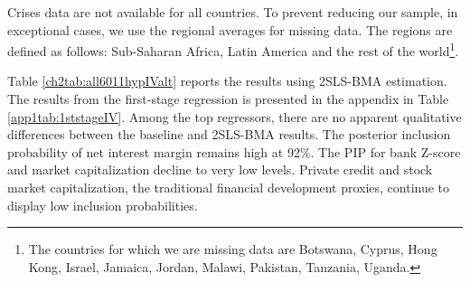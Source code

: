 \begin{refsection}
Crises data are not available for all countries. To prevent reducing our sample, in exceptional cases, we use the regional averages for missing data. The regions are defined as follows: Sub-Saharan Africa, Latin America and the rest of the world\footnote{The countries for which we are missing data are Botswana, Cyprus, Hong Kong, Israel, Jamaica, Jordan, Malawi, Pakistan, Tanzania, Uganda.}.

Table \ref{ch2tab:all6011hypIValt} reports the results using 2SLS-BMA estimation. The results from the first-stage regression is presented in the appendix in Table \ref{app1tab:1ststageIV}. Among the top regressors, there are no apparent qualitative differences between the baseline and 2SLS-BMA results. The posterior inclusion probability of net interest margin remains high at 92\%. The PIP for bank Z-score and market capitalization decline to very low levels. Private credit and stock market capitalization, the traditional financial development proxies, continue to display low inclusion probabilities.


\end{refsection}
